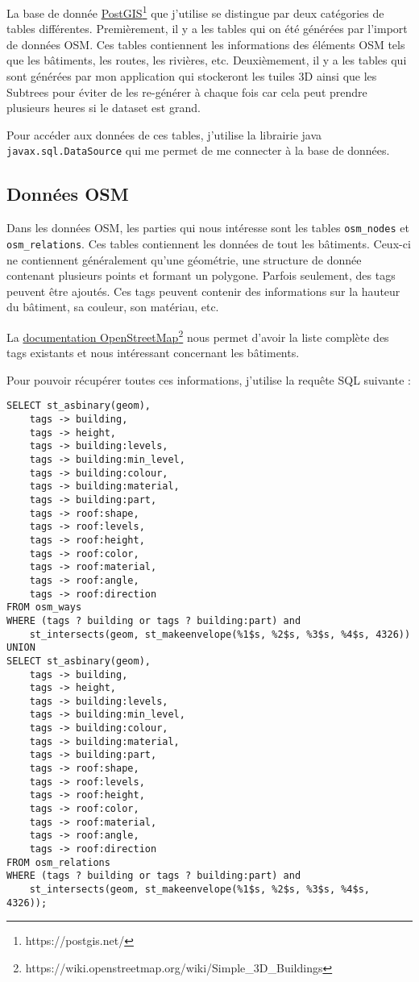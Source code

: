 La base de donnée \href{https://postgis.net/}{PostGIS}\footnote{https://postgis.net/} que j'utilise se distingue par deux catégories de tables différentes. Premièrement, il y a les tables qui on été générées par l'import de données OSM. Ces tables contiennent les informations des éléments OSM tels que les bâtiments, les routes, les rivières, etc. Deuxièmement, il y a les tables qui sont générées par mon application qui stockeront les tuiles 3D ainsi que les Subtrees pour éviter de les re-générer à chaque fois car cela peut prendre plusieurs heures si le dataset est grand.

Pour accéder aux données de ces tables, j'utilise la librairie java \texttt{javax.sql.DataSource} qui me permet de me connecter à la base de données.

\subsection{Données OSM}

Dans les données OSM, les parties qui nous intéresse sont les tables \texttt{osm\_nodes} et \texttt{osm\_relations}. Ces tables contiennent les données de tout les bâtiments. Ceux-ci ne contiennent généralement qu'une \Gls{géométrie}, une structure de donnée contenant plusieurs points et formant un polygone. Parfois seulement, des \Gls{tags} peuvent être ajoutés. Ces tags peuvent contenir des informations sur la hauteur du bâtiment, sa couleur, son matériau, etc.

La \href{https://wiki.openstreetmap.org/wiki/Simple_3D_Buildings}{documentation OpenStreetMap}\footnote{https://wiki.openstreetmap.org/wiki/Simple\_3D\_Buildings} nous permet d'avoir la liste complète des tags existants et nous intéressant concernant les bâtiments.

Pour pouvoir récupérer toutes ces informations, j'utilise la requête SQL suivante :

\newpage
\begin{verbatim}
SELECT st_asbinary(geom),
    tags -> building,
    tags -> height,
    tags -> building:levels,
    tags -> building:min_level,
    tags -> building:colour,
    tags -> building:material,
    tags -> building:part,
    tags -> roof:shape,
    tags -> roof:levels,
    tags -> roof:height,
    tags -> roof:color,
    tags -> roof:material,
    tags -> roof:angle,
    tags -> roof:direction
FROM osm_ways
WHERE (tags ? building or tags ? building:part) and
    st_intersects(geom, st_makeenvelope(%1$s, %2$s, %3$s, %4$s, 4326))
UNION
SELECT st_asbinary(geom),
    tags -> building,
    tags -> height,
    tags -> building:levels,
    tags -> building:min_level,
    tags -> building:colour,
    tags -> building:material,
    tags -> building:part,
    tags -> roof:shape,
    tags -> roof:levels,
    tags -> roof:height,
    tags -> roof:color,
    tags -> roof:material,
    tags -> roof:angle,
    tags -> roof:direction
FROM osm_relations
WHERE (tags ? building or tags ? building:part) and
    st_intersects(geom, st_makeenvelope(%1$s, %2$s, %3$s, %4$s, 4326));
\end{verbatim}

